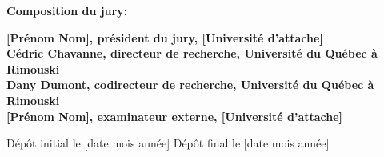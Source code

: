 \thispagestyle{empty}

\null
\vfill
\noindent \textbf{Composition du jury:}\\
\vspace{1cm}

\begin{singlespace}
  \noindent \textbf{[Prénom Nom], président du jury, [Université d’attache]}\\

  \noindent \textbf{Cédric Chavanne, directeur de recherche, Université du Québec à Rimouski}\\

  \noindent \textbf{Dany Dumont, codirecteur de recherche, Université du Québec à Rimouski}\\

  \noindent \textbf{[Prénom Nom], examinateur externe, [Université d’attache]}\\
\end{singlespace}

\vspace{2cm}
\noindent Dépôt initial le [date mois année] 
\hspace{3cm}
Dépôt final le [date mois année]


\cleardoublepage
